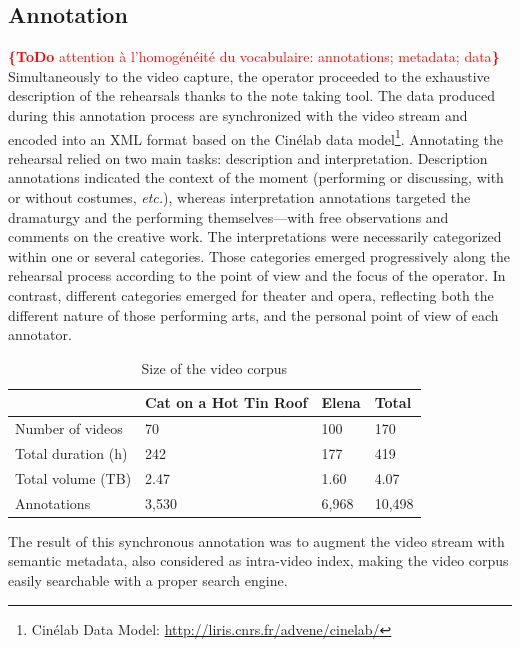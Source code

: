 \documentclass[conference]{IEEEtran}
\newcommand{\todo}[1]{\noindent\textcolor{red}{{\bf \{ToDo} #1{\bf \}}}}
\begin{document}

\subsection{Annotation}
\todo{attention à l'homogénéité du vocabulaire: annotations; metadata; data}
Simultaneously to the video capture, the operator proceeded to the exhaustive description of the rehearsals thanks to the note taking tool. The data produced during this annotation process are synchronized with the video stream and encoded into an XML format based on the Cinélab data model\footnote{Cinélab Data Model: \url{http://liris.cnrs.fr/advene/cinelab/}}.
Annotating the rehearsal relied on two main tasks: description and interpretation.  Description annotations indicated the context of the moment (performing or discussing, with or without costumes, \emph{etc.}), whereas interpretation annotations targeted the dramaturgy and the performing themselves---with free observations and comments on the creative work. The interpretations were necessarily categorized within one or several categories. Those categories emerged progressively along the rehearsal process according to the point of view and the focus of the operator. 
In contrast, different categories emerged for theater and opera, reflecting both the different nature of those performing arts, and the personal point of view of each annotator.

\begin{table}
\small
\begin{tabular}{|p{2.8cm}|p{1.8cm}|p{1.2cm}|p{1.2cm}|}
\hline 
  & Cat on a Hot Tin Roof  & Elena & Total \\ 
\hline 
Number of videos & 70 & 100 & 170 \\ 
\hline 
Total duration (h) & 242 & 177 & 419 \\ 
\hline 
Total volume (TB) & 2.47 & 1.60 & 4.07 \\ 
\hline 
Annotations & 3,530 & 6,968 & 10,498\\ 
\hline
\end{tabular} 
\caption{Size of the video corpus}
\label{table_facts}
\end{table}

The result of this synchronous annotation was to augment the video stream with semantic metadata, also considered as intra-video index, making the video corpus easily searchable with a proper search engine.
\end{document}
